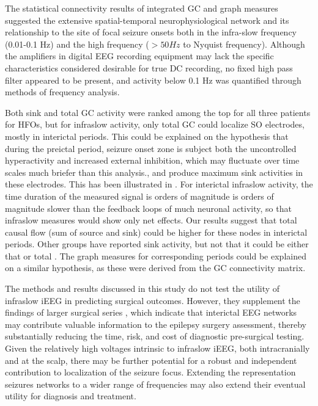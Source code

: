 The statistical connectivity results of integrated GC and graph measures suggested the extensive spatial-temporal neurophysiological network and its relationship to the site of focal seizure onsets both in the infra-slow frequency (0.01-0.1 Hz) and the high frequency ($> 50 Hz$ to Nyquist frequency).  Although the amplifiers in digital EEG recording equipment may lack the specific characteristics considered desirable for true DC recording, no fixed high pass filter appeared to be present, and activity below 0.1 Hz was quantified through methods of frequency analysis. 

Both sink and total GC activity were ranked among the top for all three patients for HFOs, but for infraslow activity, only total GC could localize SO electrodes, mostly in interictal periods. This could be explained on the hypothesis that during the preictal period, seizure onset zone is subject both the uncontrolled hyperactivity and increased external inhibition, which may fluctuate over time scales much briefer than this analysis., and produce maximum sink activities in these electrodes. This has been illustrated  in \citep{epstein2014application}. For interictal infraslow activity, the time duration of the measured signal is orders of magnitude is orders of magnitude slower than the feedback loops of much neuronal activity, so that infraslow measures would show only net effects. Our results suggest that total causal flow (sum of source and sink) could be higher for these nodes in interictal periods. Other groups have reported sink activity, but not that it could be either that or total \citep{narasimhan2020seizure}. The graph measures for corresponding periods could be explained on a similar hypothesis, as these were derived from the GC connectivity matrix. 


The methods and results discussed in this study do not test the utility of infraslow iEEG in predicting surgical outcomes. However, they supplement the findings of larger surgical series \citep{narasimhan2020seizure, david2011imaging}, which indicate that interictal EEG networks may contribute valuable information to the epilepsy surgery assessment, thereby substantially reducing the time, risk, and cost of diagnostic pre-surgical testing. Given the relatively high voltages intrinsic to infraslow iEEG, both intracranially and at the scalp, there may be further potential for a robust and independent contribution to localization of the seizure focus. Extending the representation seizures networks to a wider range of frequencies may also extend their eventual utility for diagnosis and treatment. 